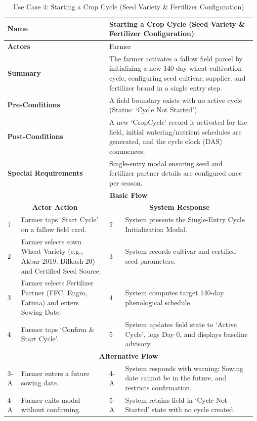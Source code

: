 \begin{table}[H]
\small
\centering
\caption{Use Case 4: Starting a Crop Cycle (Seed Variety \& Fertilizer Configuration)}
\label{tab:uc4}
\begin{tabular}{|p{0.6cm}|p{6.4cm}|p{0.8cm}|p{6.6cm}|}
\hline
\multicolumn{2}{|p{7.0cm}|}{\textbf{Name}} & \multicolumn{2}{p{7.4cm}|}{Starting a Crop Cycle (Seed Variety \& Fertilizer Configuration)} \\ \hline
\multicolumn{2}{|p{7.0cm}|}{\textbf{Actors}} & \multicolumn{2}{p{7.4cm}|}{Farmer} \\ \hline
\multicolumn{2}{|p{7.0cm}|}{\textbf{Summary}} & \multicolumn{2}{p{7.4cm}|}{The farmer activates a fallow field parcel by initializing a new 140-day wheat cultivation cycle, configuring seed cultivar, supplier, and fertilizer brand in a single entry step.} \\ \hline
\multicolumn{2}{|p{7.0cm}|}{\textbf{Pre-Conditions}} & \multicolumn{2}{p{7.4cm}|}{A field boundary exists with no active cycle (Status: `Cycle Not Started').} \\ \hline
\multicolumn{2}{|p{7.0cm}|}{\textbf{Post-Conditions}} & \multicolumn{2}{p{7.4cm}|}{A new `CropCycle' record is activated for the field, initial watering/nutrient schedules are generated, and the cycle clock (DAS) commences.} \\ \hline
\multicolumn{2}{|p{7.0cm}|}{\textbf{Special Requirements}} & \multicolumn{2}{p{7.4cm}|}{Single-entry modal ensuring seed and fertilizer partner details are configured once per season.} \\ \hline
\multicolumn{4}{|c|}{\textbf{Basic Flow}} \\ \hline
\multicolumn{2}{|c|}{\textbf{Actor Action}} & \multicolumn{2}{c|}{\textbf{System Response}} \\ \hline
1 & Farmer taps `Start Cycle' on a fallow field card. & 2 & System presents the Single-Entry Cycle Initialization Modal. \\ \hline
2 & Farmer selects sown Wheat Variety (e.g., Akbar-2019, Dilkash-20) and Certified Seed Source. & 3 & System records cultivar and certified seed parameters. \\ \hline
3 & Farmer selects Fertilizer Partner (FFC, Engro, Fatima) and enters Sowing Date. & 4 & System computes target 140-day phenological schedule. \\ \hline
4 & Farmer taps `Confirm \& Start Cycle'. & 5 & System updates field state to `Active Cycle', logs Day 0, and displays baseline advisory. \\ \hline
\multicolumn{4}{|c|}{\textbf{Alternative Flow}} \\ \hline
3-A & Farmer enters a future sowing date. & 4-A & System responds with warning: Sowing date cannot be in the future, and restricts confirmation. \\ \hline
4-A & Farmer exits modal without confirming. & 5-A & System retains field in `Cycle Not Started' state with no cycle created. \\ \hline
\end{tabular}
\end{table}

